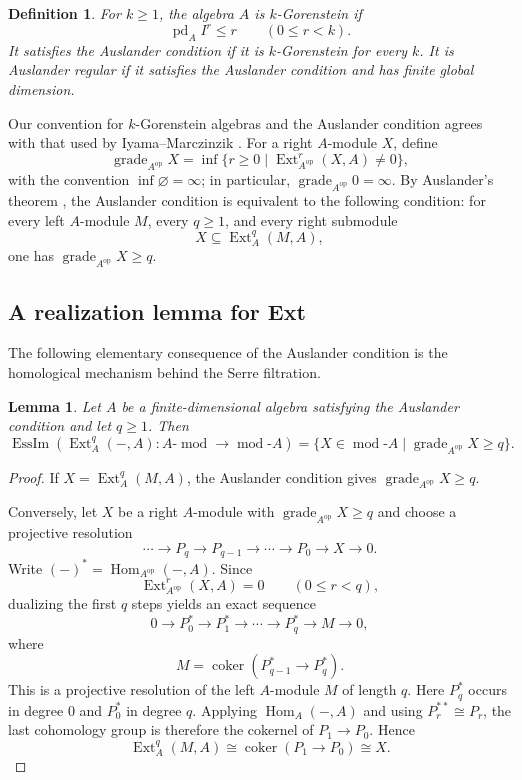 \documentclass[10pt,a4paper]{amsart}
\newtheorem{lemma}[theorem]{Lemma}
\newtheorem{definition}[theorem]{Definition}
\newcommand{\Hom}{\operatorname{Hom}}
\newcommand{\Ext}{\operatorname{Ext}}
\newcommand{\grade}{\operatorname{grade}}
\newcommand{\EssIm}{\operatorname{EssIm}}
\newcommand{\modcat}{\operatorname{mod}}
\begin{document}
\begin{definition}
For $k\ge1$, the algebra $A$ is \emph{$k$-Gorenstein} if
\[
\operatorname{pd}_A I^r\le r
\qquad (0\le r<k).
\]
It satisfies the \emph{Auslander condition} if it is $k$-Gorenstein for every $k$.  It is \emph{Auslander regular} if it satisfies the Auslander condition and has finite global dimension.
\end{definition}

Our convention for $k$-Gorenstein algebras and the Auslander condition agrees with that used by Iyama--Marczinzik \cite{IM}.  For a right $A$-module $X$, define
$$
\grade_{A^{\mathrm{op}}} X
=
\inf\{r\ge0\mid \Ext^r_{A^{\mathrm{op}}}(X,A)\ne0\},
$$
with the convention $\inf\varnothing=\infty$; in particular,
$\grade_{A^{\mathrm{op}}}0=\infty$.
By Auslander's theorem \cite[Theorem~3.7]{FGR}, the Auslander condition is equivalent to the following condition: for every left $A$-module $M$, every $q\ge1$, and every right submodule
$$
X\subseteq\Ext_A^q(M,A),
$$
one has $\grade_{A^{\mathrm{op}}} X\ge q.$


\subsection{A realization lemma for Ext}

The following elementary consequence of the Auslander condition is the homological mechanism behind the Serre filtration.

\begin{lemma}\label{lem:realization}
Let $A$ be a finite-dimensional algebra satisfying the Auslander condition and let $q\ge1$.  Then
\[
\EssIm\left(
\Ext_A^q(-,A):A\text{-}\modcat\longrightarrow\modcat\text{-}A
\right)
=
\{X\in\modcat\text{-}A\mid \grade_{A^{\mathrm{op}}} X\ge q\}.
\]
\end{lemma}

\begin{proof}
If $X=\Ext_A^q(M,A)$, the Auslander condition gives $\grade_{A^{\mathrm{op}}} X\ge q$.

Conversely, let $X$ be a right $A$-module with $\grade_{A^{\mathrm{op}}} X\ge q$ and choose a projective resolution
\[
\cdots\longrightarrow P_q\longrightarrow P_{q-1}\longrightarrow\cdots\longrightarrow P_0\longrightarrow X\longrightarrow0.
\]
Write $(-)^*=\Hom_{A^{\mathrm{op}}}(-,A)$.  Since
\[
\Ext^r_{A^{\mathrm{op}}}(X,A)=0
\qquad (0\le r<q),
\]
dualizing the first $q$ steps yields an exact sequence
\[
0\longrightarrow P_0^*\longrightarrow P_1^*\longrightarrow\cdots\longrightarrow P_q^*\longrightarrow M\longrightarrow0,
\]
where
\[
M=\operatorname{coker}(P_{q-1}^*\longrightarrow P_q^*).
\]
This is a projective resolution of the left $A$-module $M$ of length $q$.
Here $P_q^*$ occurs in degree $0$ and $P_0^*$ in degree $q$.  Applying
$\Hom_A(-,A)$ and using $P_r^{**}\cong P_r$, the last cohomology group is
therefore the cokernel of $P_1\to P_0$.  Hence
\[
\Ext_A^q(M,A)
\cong
\operatorname{coker}(P_1\longrightarrow P_0)
\cong X.
\]
\end{proof}
\end{document}

